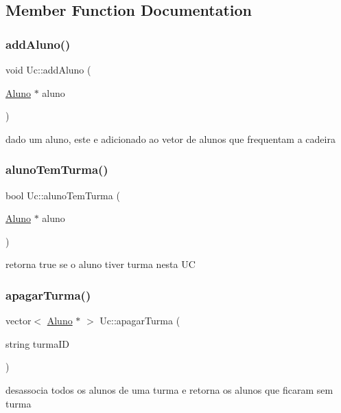 \subsection{Member Function Documentation}
\hypertarget{class_uc_a89ed45830454cdf2f4a7528237db2c7d}{}\label{class_uc_a89ed45830454cdf2f4a7528237db2c7d} 
\subsubsection{\texorpdfstring{add\+Aluno()}{addAluno()}}
{\footnotesize\ttfamily void Uc\+::add\+Aluno (\begin{DoxyParamCaption}\item[{\hyperlink{class_aluno}{Aluno} $\ast$}]{aluno }\end{DoxyParamCaption})}

dado um aluno, este e adicionado ao vetor de alunos que frequentam a cadeira \hypertarget{class_uc_a1c290a83c5948f6f494e28d21d4c3e2c}{}\label{class_uc_a1c290a83c5948f6f494e28d21d4c3e2c} 
\subsubsection{\texorpdfstring{aluno\+Tem\+Turma()}{alunoTemTurma()}}
{\footnotesize\ttfamily bool Uc\+::aluno\+Tem\+Turma (\begin{DoxyParamCaption}\item[{\hyperlink{class_aluno}{Aluno} $\ast$}]{aluno }\end{DoxyParamCaption})}

retorna true se o aluno tiver turma nesta UC \hypertarget{class_uc_acab5ac7d43c6733925b4a0127b41a5cf}{}\label{class_uc_acab5ac7d43c6733925b4a0127b41a5cf} 
\subsubsection{\texorpdfstring{apagar\+Turma()}{apagarTurma()}}
{\footnotesize\ttfamily vector$<$ \hyperlink{class_aluno}{Aluno} $\ast$ $>$ Uc\+::apagar\+Turma (\begin{DoxyParamCaption}\item[{string}]{turma\+ID }\end{DoxyParamCaption})}

desassocia todos os alunos de uma turma e retorna os alunos que ficaram sem turma \hypertarget{class_uc_a02b0eae5f450580e7d20cb8c10205c3a}{}\label{class_uc_a02b0eae5f450580e7d20cb8c10205c3a} 
